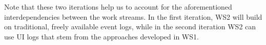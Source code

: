 Note that these two iterations help us to account for the aforementioned interdependencies between the work streams. In the first iteration, WS2 will build on traditional, freely available event logs, while in the second iteration WS2 can use UI logs that stem from the approaches developed in WS1. 



